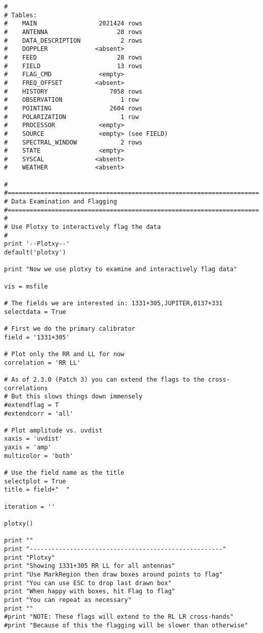 \begin{verbatim}
# 
# Tables:
#    MAIN                 2021424 rows     
#    ANTENNA                   28 rows     
#    DATA_DESCRIPTION           2 rows     
#    DOPPLER             <absent>  
#    FEED                      28 rows     
#    FIELD                     13 rows     
#    FLAG_CMD             <empty>  
#    FREQ_OFFSET         <absent>  
#    HISTORY                 7058 rows     
#    OBSERVATION                1 row      
#    POINTING                2604 rows     
#    POLARIZATION               1 row      
#    PROCESSOR            <empty>  
#    SOURCE               <empty> (see FIELD)
#    SPECTRAL_WINDOW            2 rows     
#    STATE                <empty>  
#    SYSCAL              <absent>  
#    WEATHER             <absent>  

# 
#=====================================================================
# Data Examination and Flagging
#=====================================================================
# 
# Use Plotxy to interactively flag the data
#
print '--Plotxy--'
default('plotxy')

print "Now we use plotxy to examine and interactively flag data"

vis = msfile

# The fields we are interested in: 1331+305,JUPITER,0137+331
selectdata = True

# First we do the primary calibrator
field = '1331+305'

# Plot only the RR and LL for now
correlation = 'RR LL'

# As of 2.3.0 (Patch 3) you can extend the flags to the cross-correlations
# But this slows things down immensely
#extendflag = T
#extendcorr = 'all'

# Plot amplitude vs. uvdist
xaxis = 'uvdist'
yaxis = 'amp'
multicolor = 'both'

# Use the field name as the title
selectplot = True
title = field+"  "

iteration = ''

plotxy()

print ""
print "-----------------------------------------------------"
print "Plotxy"
print "Showing 1331+305 RR LL for all antennas"
print "Use MarkRegion then draw boxes around points to flag"
print "You can use ESC to drop last drawn box"
print "When happy with boxes, hit Flag to flag"
print "You can repeat as necessary"
print ""
#print "NOTE: These flags will extend to the RL LR cross-hands"
#print "Because of this the flagging will be slower than otherwise"


\end{verbatim}
